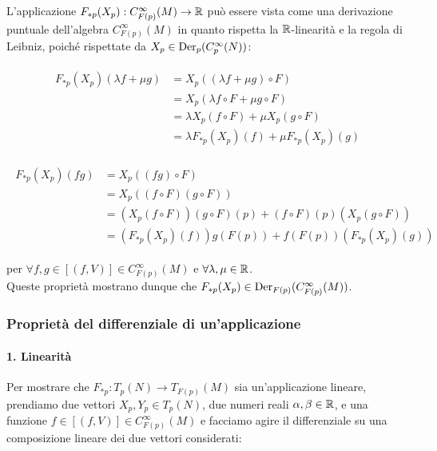L'applicazione $ F_{*p}(X_{p}) : C_{F(p)}^{\infty}(M) \to \mathbb{R} $ può essere vista come una derivazione puntuale dell'algebra $ C_{F(p)}^{\infty}(M) $ in quanto rispetta la $ \mathbb{R} $-linearità e la regola di Leibniz, poiché rispettate da $ X_{p} \in \operatorname{Der}_{p}(C_{p}^{\infty}(N)) $:

\begin{align}
	\begin{split}
		F_{*p}(X_{p})(\lambda f + \mu g) &= X_{p}((\lambda f + \mu g) \circ F)\\
		&= X_{p}(\lambda f \circ F + \mu g \circ F)\\
		&= \lambda X_{p}(f \circ F) + \mu X_{p}(g \circ F)\\
		&= \lambda F_{*p}(X_{p})(f) + \mu F_{*p}(X_{p})(g)
	\end{split}
\end{align}

\begin{align}
	\begin{split}
		F_{*p}(X_{p})(f g) &= X_{p}((f g) \circ F)\\
		&= X_{p}((f \circ F) (g \circ F))\\
		&= \left( X_{p}(f \circ F) \right) (g \circ F)(p) + (f \circ F)(p) \left( X_{p}(g \circ F) \right)\\
		&= \left( F_{*p}(X_{p})(f) \right) g(F(p)) + f(F(p)) \left( F_{*p}(X_{p})(g) \right)
	\end{split}
\end{align}

per $ \forall f, g \in [(f,V)] \in C_{F(p)}^{\infty}(M) $ e $ \forall \lambda, \mu \in \mathbb{R} $.\\
Queste proprietà mostrano dunque che $ F_{*p}(X_{p}) \in \operatorname{Der}_{F(p)}(C_{F(p)}^{\infty}(M)) $.

\subsubsection{Proprietà del differenziale di un'applicazione}

\paragraph{1. Linearità}

Per mostrare che $ F_{*p} : T_{p}(N) \to T_{F(p)}(M) $ sia un'applicazione lineare, prendiamo due vettori $ X_{p},Y_{p} \in T_{p}(N) $, due numeri reali $ \alpha,\beta \in \mathbb{R} $, e una funzione $ f \in [(f,V)] \in C_{F(p)}^{\infty}(M) $ e facciamo agire il differenziale su una composizione lineare dei due vettori considerati:

